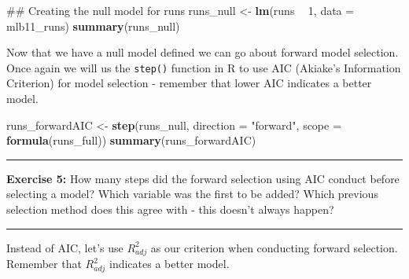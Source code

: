 \documentclass[]{book}
\newenvironment{Shaded}{\begin{snugshade}}{\end{snugshade}}
\newcommand{\KeywordTok}[1]{\textcolor[rgb]{0.13,0.29,0.53}{\textbf{#1}}}
\newcommand{\DataTypeTok}[1]{\textcolor[rgb]{0.13,0.29,0.53}{#1}}
\newcommand{\DecValTok}[1]{\textcolor[rgb]{0.00,0.00,0.81}{#1}}
\newcommand{\StringTok}[1]{\textcolor[rgb]{0.31,0.60,0.02}{#1}}
\newcommand{\OperatorTok}[1]{\textcolor[rgb]{0.81,0.36,0.00}{\textbf{#1}}}
\newcommand{\NormalTok}[1]{#1}
\theoremstyle{definition}
\theoremstyle{definition}
\theoremstyle{definition}
\theoremstyle{remark}
\begin{document}
\begin{Shaded}
\begin{Highlighting}[]
\NormalTok{## Creating the null model for runs}
\NormalTok{runs_null <-}\StringTok{ }\KeywordTok{lm}\NormalTok{(runs }\OperatorTok{~}\StringTok{ }\DecValTok{1}\NormalTok{, }\DataTypeTok{data =}\NormalTok{ mlb11_runs)}
\KeywordTok{summary}\NormalTok{(runs_null)}
\end{Highlighting}
\end{Shaded}

Now that we have a null model defined we can go about forward model
selection. Once again we will us the \texttt{step()} function in R to
use AIC (Akiake's Information Criterion) for model selection - remember
that lower AIC indicates a better model.

\begin{Shaded}
\begin{Highlighting}[]
\NormalTok{runs_forwardAIC <-}\StringTok{ }\KeywordTok{step}\NormalTok{(runs_null, }\DataTypeTok{direction =} \StringTok{"forward"}\NormalTok{, }\DataTypeTok{scope =} \KeywordTok{formula}\NormalTok{(runs_full))}
\KeywordTok{summary}\NormalTok{(runs_forwardAIC)}
\end{Highlighting}
\end{Shaded}

\begin{center}\rule{0.5\linewidth}{\linethickness}\end{center}

\textbf{Exercise 5:} How many steps did the forward selection using AIC
conduct before selecting a model? Which variable was the first to be
added? Which previous selection method does this agree with - this
doesn't always happen?

\begin{center}\rule{0.5\linewidth}{\linethickness}\end{center}

Instead of AIC, let's use \(R^2_{adj}\) as our criterion when conducting
forward selection. Remember that \(R^2_{adj}\) indicates a better model.
\end{document}
